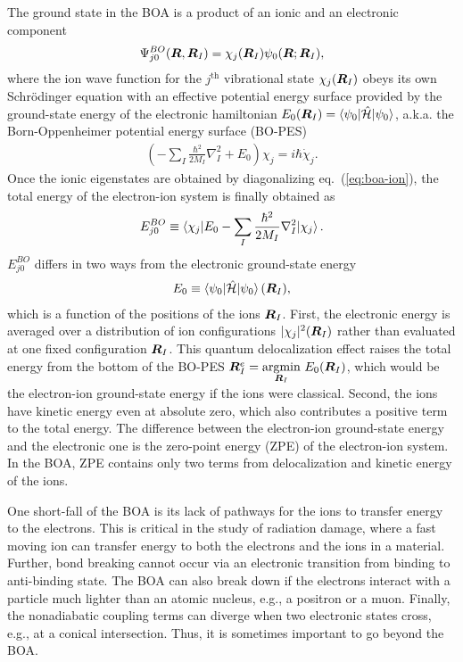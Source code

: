 The ground state in the BOA is a product of an ionic and an electronic component
\begin{align} \label{eq:intro-boa-product}
\Psi_{j 0}^{BO}(\boldsymbol{R},\boldsymbol{R}_I) = \chi_j(\boldsymbol{R}_I) \psi_0(\boldsymbol{R};\boldsymbol{R}_I),
\end{align}
where the ion wave function for the $j^{\text{th}}$ vibrational state $\chi_j(\boldsymbol{R}_I)$ obeys its own Schr\"odinger equation with an effective potential energy surface provided by the ground-state energy of the electronic hamiltonian $E_0(\boldsymbol{R}_I) = \braket{\psi_0|\hat{\mathcal{H}}|\psi_0}$, a.k.a. the Born-Oppenheimer potential energy surface (BO-PES)
\begin{align} \label{eq:boa-ion}
\left(-\sum_I\frac{\hbar^2}{2M_I}\nabla^2_I+E_0\right)\chi_j = i\hbar\dot{\chi}_j.
\end{align}
Once the ionic eigenstates are obtained by diagonalizing eq.~(\ref{eq:boa-ion}), the total energy of the electron-ion system is finally obtained as
\begin{align}
E_{j0}^{BO} \equiv \braket{\chi_j| E_0 -\sum_I\frac{\hbar^2}{2M_I}\nabla^2_I |\chi_j}.
\end{align}
$E_{j0}^{BO}$ differs in two ways from the electronic ground-state energy
\begin{align}
E_0 \equiv \braket{\psi_0|\hat{\mathcal{H}}|\psi_0}(\boldsymbol{R}_I),
\end{align}
which is a function of the positions of the ions $\boldsymbol{R}_I$. First, the electronic energy is averaged over a distribution of ion configurations $\vert\chi_j\vert^2(\boldsymbol{R}_I)$ rather than evaluated at one fixed configuration $\boldsymbol{R}_I$. This quantum delocalization effect raises the total energy from the bottom of the BO-PES $\boldsymbol{R}_I^e=\underset{\boldsymbol{R}_I}{\text{argmin}}~E_0(\boldsymbol{R}_I)$, which would be the electron-ion ground-state energy if the ions were classical. Second, the ions have kinetic energy even at absolute zero, which also contributes a positive term to the total energy.
The difference between the electron-ion ground-state energy and the electronic one is the zero-point energy (ZPE) of the electron-ion system. In the BOA, ZPE contains only two terms from delocalization and kinetic energy of the ions.

One short-fall of the BOA is its lack of pathways for the ions to transfer energy to the electrons. This is critical in the study of radiation damage, where a fast moving ion can transfer energy to both the electrons and the ions in a material. Further, bond breaking cannot occur via an electronic transition from binding to anti-binding state. The BOA can also break down if the electrons interact with a particle much lighter than an atomic nucleus, e.g., a positron or a muon. Finally, the nonadiabatic coupling terms can diverge when two electronic states cross, e.g., at a conical intersection. Thus, it is sometimes important to go beyond the BOA.

